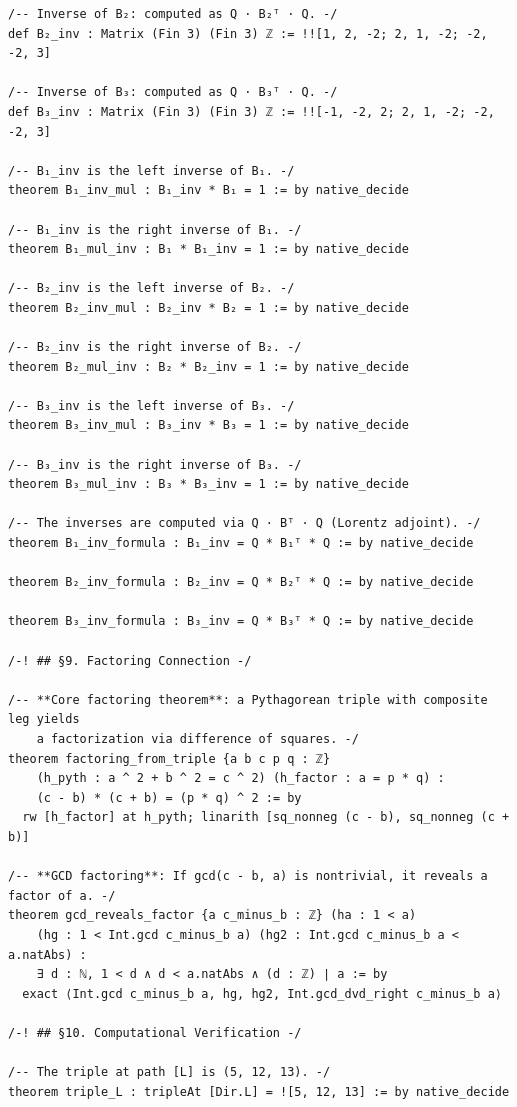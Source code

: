 \documentclass[11pt,openany]{book}
\theoremstyle{definition}
\theoremstyle{plain}
\theoremstyle{remark}
\begin{document}
\begin{lstlisting}[style=lean]
/-- Inverse of B₂: computed as Q · B₂ᵀ · Q. -/
def B₂_inv : Matrix (Fin 3) (Fin 3) ℤ := !![1, 2, -2; 2, 1, -2; -2, -2, 3]

/-- Inverse of B₃: computed as Q · B₃ᵀ · Q. -/
def B₃_inv : Matrix (Fin 3) (Fin 3) ℤ := !![-1, -2, 2; 2, 1, -2; -2, -2, 3]

/-- B₁_inv is the left inverse of B₁. -/
theorem B₁_inv_mul : B₁_inv * B₁ = 1 := by native_decide

/-- B₁_inv is the right inverse of B₁. -/
theorem B₁_mul_inv : B₁ * B₁_inv = 1 := by native_decide

/-- B₂_inv is the left inverse of B₂. -/
theorem B₂_inv_mul : B₂_inv * B₂ = 1 := by native_decide

/-- B₂_inv is the right inverse of B₂. -/
theorem B₂_mul_inv : B₂ * B₂_inv = 1 := by native_decide

/-- B₃_inv is the left inverse of B₃. -/
theorem B₃_inv_mul : B₃_inv * B₃ = 1 := by native_decide

/-- B₃_inv is the right inverse of B₃. -/
theorem B₃_mul_inv : B₃ * B₃_inv = 1 := by native_decide

/-- The inverses are computed via Q · Bᵀ · Q (Lorentz adjoint). -/
theorem B₁_inv_formula : B₁_inv = Q * B₁ᵀ * Q := by native_decide

theorem B₂_inv_formula : B₂_inv = Q * B₂ᵀ * Q := by native_decide

theorem B₃_inv_formula : B₃_inv = Q * B₃ᵀ * Q := by native_decide

/-! ## §9. Factoring Connection -/

/-- **Core factoring theorem**: a Pythagorean triple with composite leg yields
    a factorization via difference of squares. -/
theorem factoring_from_triple {a b c p q : ℤ}
    (h_pyth : a ^ 2 + b ^ 2 = c ^ 2) (h_factor : a = p * q) :
    (c - b) * (c + b) = (p * q) ^ 2 := by
  rw [h_factor] at h_pyth; linarith [sq_nonneg (c - b), sq_nonneg (c + b)]

/-- **GCD factoring**: If gcd(c - b, a) is nontrivial, it reveals a factor of a. -/
theorem gcd_reveals_factor {a c_minus_b : ℤ} (ha : 1 < a)
    (hg : 1 < Int.gcd c_minus_b a) (hg2 : Int.gcd c_minus_b a < a.natAbs) :
    ∃ d : ℕ, 1 < d ∧ d < a.natAbs ∧ (d : ℤ) ∣ a := by
  exact ⟨Int.gcd c_minus_b a, hg, hg2, Int.gcd_dvd_right c_minus_b a⟩

/-! ## §10. Computational Verification -/

/-- The triple at path [L] is (5, 12, 13). -/
theorem triple_L : tripleAt [Dir.L] = ![5, 12, 13] := by native_decide


\end{lstlisting}
\end{document}
